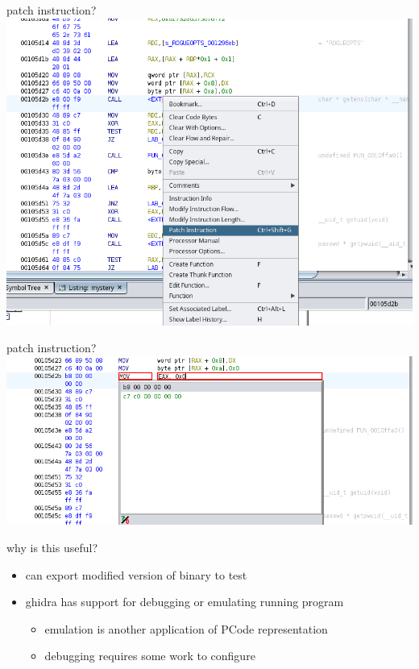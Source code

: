 \begin{frame}{patch instruction?}
\includegraphics[width=\textwidth]{../re-tools/ghidra-patch-ex}
\end{frame}

\begin{frame}{patch instruction?}
\includegraphics[width=\textwidth]{../re-tools/ghidra-patch-ex2}
\end{frame}

\begin{frame}{why is this useful?}
    \begin{itemize}
    \item can export modified version of binary to test
    \item ghidra has support for debugging or emulating running program
        \begin{itemize}
        \item emulation is another application of PCode representation
        \item debugging requires some work to configure
        \end{itemize}
    \end{itemize}
\end{frame}

